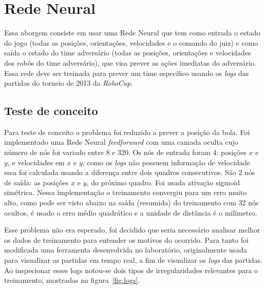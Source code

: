 \section{Rede Neural}\label{cap:abordagem_rede_neural}

Essa aborgem consiste em usar uma Rede Neural que tem como entrada o estado do
jogo (todas as posições, orientações, velocidades e o comando do juiz) e como
saída o estado do time adversário (todas as posições, orientações e velocidades
dos robôs do time adversário), que visa prever as ações imediatas do adversário.
Essa rede deve ser treinada para prever um time específico usando os
\textit{logs} das partidas do torneio de 2013 da \textit{RoboCup}.

\subsection{Teste de conceito}

Para teste de conceito o problema foi reduzido a prever a posição da bola. Foi
implementado uma Rede Neural \textit{feedforward} com uma camada oculta cujo
número de nós foi variado entre 8 e 320. Os nós de entrada foram 4: posições $x$
e $y$, e velocidades em $x$ e $y$, como os \textit{logs} não possuem informação
de velocidade essa foi calculada usando a diferença entre dois quadros
consecutivos. São 2 nós de saída: as posições $x$ e $y$, do próximo quadro. Foi
usada ativação sigmoid simétrica. Nessa implementação o treinamento convergiu
para um erro muito alto, como pode ser visto abaixo na saída (resumida) do
treinamento com 32 nós ocultos, é usado o erro médio quadrático e a unidade de
distância é o milímetro.



Esse problema não era esperado, foi decidido que seria necessário analisar
melhor os dados de treinamento para entender os motivos do ocorrido. Para tanto
foi modificada uma ferramenta desenvolvida no laboratório, originalmente usada
para visualizar as partidas em tempo real, a fim de visualizar os \textit{logs}
das partidas. Ao inspecionar esses logs notou-se dois tipos de irregularidades
relevantes para o treinamento, mostradas na figura~\ref{fig:logs}.

